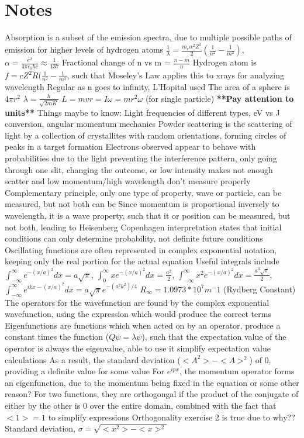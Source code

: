 \documentclass[11 pt, twoside]{article}
\newenvironment{outline*}
{
	\begin{outline}[enumerate]
	}
	{\end{outline}
}
\begin{document}
\section{Notes}
\begin{outline*}
\1 Absorption is a subset of the emission spectra, due to multiple possible paths of emission for higher levels of hydrogen atoms
\1 $\frac{1}{\lambda} = \frac{m_e \alpha^2 Z^2}{2} (\frac{1}{n^2} - \frac{1}{m^2})$, $\alpha = \frac{e^2}{4\pi \epsilon_0 \hbar c} \approx \frac{1}{137}$
\1 Fractional change of n vs m = $\frac{n - m}{n}$
\1 Hydrogen atom is $f = cZ^2R(\frac{1}{n^2} - \frac{1}{m^2}$, such that Moseley's Law applies this to xrays for analyzing wavelength
\1 Regular as n goes to infinity, L'Hopital used 
\1 The area of a sphere is $4\pi r^2$
\1 $\lambda = \frac{h}{\sqrt{2mK}}$
\1 $L = mvr = I\omega = mr^2 \omega$ (for single particle)
\1 \textbf{**Pay attention to units**}
\1 Things maybe to know: Light frequencies of different types, eV vs J conversion, angular momentum mechanics
\1 Powder scattering is the scattering of light by a collection of crystallites with random orientations, forming circles of peaks in a target formation
\1 Electrons observed appear to behave with probabilities due to the light preventing the interference pattern, only going through one slit, changing the outcome, or low intensity makes not enough scatter and low momentum/high wavelength don't measure properly
	\2 Complementary principle, only one type of property, wave or particle, can be measured, but not both can be
		\3 Since momentum is proportional inversely to wavelength, it is a wave property, such that it or position can be measured, but not both, leading to Heisenberg
\1 Copenhagen interpretation states that initial conditions can only determine probability, not definite future conditions
\1 Oscillating functions are often represented in complex exponential notation, keeping only the real portion for the actual equation
\1 Useful integrals include $\int^{\infty}_{-\infty} e^{-(x/a)^2}dx = a\sqrt{\pi}$, $\int^{\infty}_{0} xe^{-(x/a)^2}dx = \frac{a^2}{2}$, $\int^{\infty}_{-\infty} x^2 e^{-(x/a)^2}dx = \frac{a^3\sqrt{\pi}}{2}$, $\int^{\infty}_{-\infty} e^{ikx-(x/a)^2}dx = a\sqrt{\pi}e^{-(a^2k^2)/4}$
\1 $R_{\infty} = 1.0973 * 10^7 m^-1$ (Rydberg Constant)
\1 The operators for the wavefunction are found by the complex exponential wavefunction, using the expression which would produce the correct terms
	\2 Eigenfunctions are functions which when acted on by an operator, produce a constant times the function ($Q\psi = \lambda \psi$), such that the expectation value of the operator is always the eigenvalue, able to use it simplify expectation value calculations
	\2 As a result, the standard deviation ($<A^2> - <A>^2$) of 0, providing a definite value for some value
	\2 For $e^{ipx}$, the momentum operator forms an eigenfunction, due to the momentum being fixed in the equation or some other reason?
\1 For two functions, they are orthogongal if the product of the conjugate of either by the other is 0 over the entire domain, combined with the fact that $<1> = 1$ to simplify expressions
	\2 Orthogonality exercise 2 is true due to why??
\1 Standard deviation, $\sigma = \sqrt{<x^2> - <x>^2}$
\end{outline*}
\end{document}
